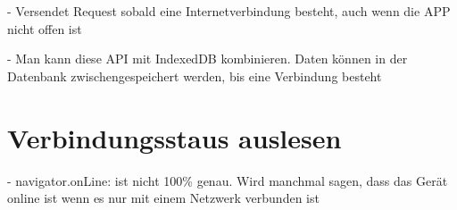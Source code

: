 - Versendet Request sobald eine Internetverbindung besteht, auch wenn die APP nicht offen ist \autocite{Rojas2020}

- Man kann diese API mit IndexedDB kombinieren. Daten können in der Datenbank zwischengespeichert werden, bis eine Verbindung besteht \autocite{Rojas2020}

\section{Verbindungsstaus auslesen}

- navigator.onLine: ist nicht 100\% genau. Wird manchmal sagen, dass das Gerät online ist wenn es nur mit einem Netzwerk verbunden ist \autocite{Sheppard2017}


